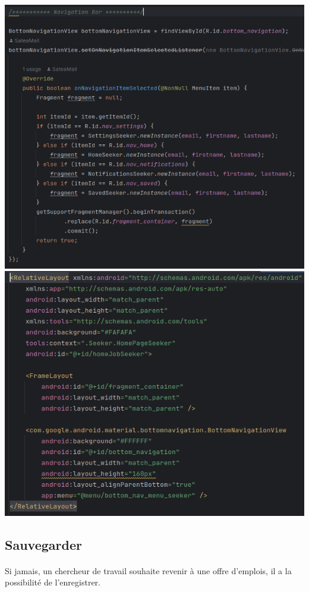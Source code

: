 \documentclass[a4paper]{article}
\begin{document}
\begin{multicols}{2}
        \noindent\includegraphics[width=.47\textwidth]{navBar/codeNavBar}
        \noindent\includegraphics[width=.47\textwidth]{navBar/layoutNavBar}
        \subsection{Sauvegarder}
        \paragraph{}
        Si jamais, un chercheur de travail souhaite revenir à une offre d'emplois, il a la possibilité de l'enregistrer.


\end{multicols}
\end{document}
